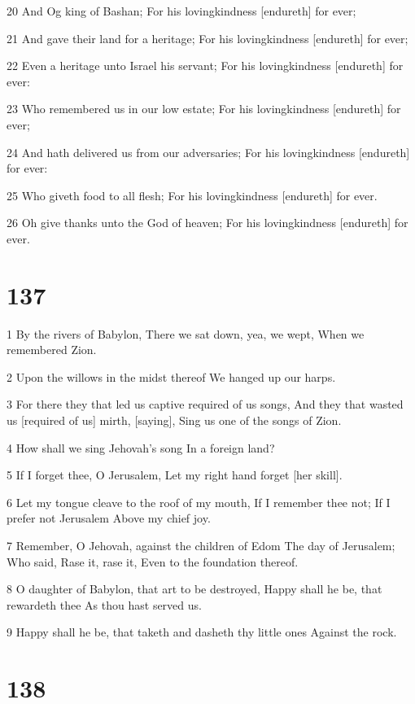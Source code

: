\par 20 And Og king of Bashan; For his lovingkindness [endureth] for ever;
\par 21 And gave their land for a heritage; For his lovingkindness [endureth] for ever;
\par 22 Even a heritage unto Israel his servant; For his lovingkindness [endureth] for ever:
\par 23 Who remembered us in our low estate; For his lovingkindness [endureth] for ever;
\par 24 And hath delivered us from our adversaries; For his lovingkindness [endureth] for ever:
\par 25 Who giveth food to all flesh; For his lovingkindness [endureth] for ever.
\par 26 Oh give thanks unto the God of heaven; For his lovingkindness [endureth] for ever.

\chapter{137}

\par 1 By the rivers of Babylon, There we sat down, yea, we wept, When we remembered Zion.
\par 2 Upon the willows in the midst thereof We hanged up our harps.
\par 3 For there they that led us captive required of us songs, And they that wasted us [required of us] mirth, [saying], Sing us one of the songs of Zion.
\par 4 How shall we sing Jehovah's song In a foreign land?
\par 5 If I forget thee, O Jerusalem, Let my right hand forget [her skill].
\par 6 Let my tongue cleave to the roof of my mouth, If I remember thee not; If I prefer not Jerusalem Above my chief joy.
\par 7 Remember, O Jehovah, against the children of Edom The day of Jerusalem; Who said, Rase it, rase it, Even to the foundation thereof.
\par 8 O daughter of Babylon, that art to be destroyed, Happy shall he be, that rewardeth thee As thou hast served us.
\par 9 Happy shall he be, that taketh and dasheth thy little ones Against the rock.

\chapter{138}


